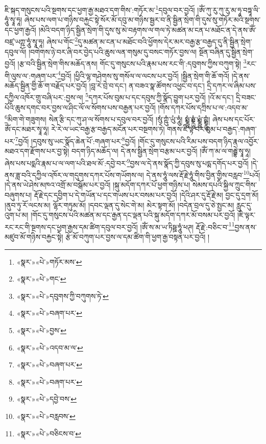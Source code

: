 ཇི་སྐད་གསུངས་པའི་སྔགས་དང་ཕྱག་རྒྱ་མཐའ་དག་གིས་:གཏོར་མ་\footnote{«སྣར་»«པེ་»གཏོར་མས་}དབུལ་བར་བྱའོ། །ཨོཾ་ཀུ་རུ་ཀུ་རུ་མ་ཧཱ་བཏྟཱ་ལི་ཧཱུཾ་སྭཱ་ཧཱ། ཞེས་པས་ལག་པ་གཉིས་བརྐྱང་སྟེ་སོར་མོ་དབུ་མ་གཉིས་སྦྱར་བ་ནི་སྦྱིན་སྲེག་གི་དུས་སུ་གཏོར་མའི་སྔགས་དང་ཕྱག་རྒྱའོ། །མེའི་བདག་ཉིད་སྦྱིན་སྲེག་གི་དུས་སུ་མེ་བརྟགས་ལ་གལ་ཏེ་མཚན་མ་ངན་པ་མཐོང་ན་དེ་ནས་ཨོཾ་བཛྲ་ཡཀྵ་ཧཱུཾ་སྭཱ་ཧཱ། ཞེས་པ་གོང་\footnote{«སྣར་»«པེ་»གང་}དུ་མཚན་མ་ངན་པ་མཐོང་བའི་ཕྱོགས་དེར་མར་བརྒྱ་རྩ་བརྒྱད་དུ་ནི་སྦྱིན་སྲེག་དབུལ་ལོ། །བགེགས་ཉེ་བར་ཞི་བར་བྱེད་པའི་ཆུས་ལན་གསུམ་དུ་བསང་གཏོར་བྱས་ལ། སྔོན་བཞིན་དུ་སྦྱིན་སྲེག་བྱའོ། །རྩ་བའི་སྦྱིན་སྲེག་གིས་མཆོད་ནས། གོང་དུ་གསུངས་པའི་རྣམ་པས་རང་གི་:དབུགས་ཀྱིས་བཀུག་སྟེ། \footnote{«སྣར་»«པེ་»དབུགས་ཀྱི་བཀུགས་ཏེ་}རང་གི་ལུས་ལ་:གཞག་པར་\footnote{«སྣར་»«པེ་»བཞག་པར་}བྱའོ། །ཕྱིའི་ལྷ་གཤེགས་སུ་གསོལ་ལ་ལངས་པར་བྱའོ། །སྦྱིན་སྲེག་གི་ཆོ་གའོ། །དེ་ནས་མཆོད་སྦྱིན་གྱི་ཆོ་ག་བརྗོད་པར་བྱའོ། །བླ་རེ་བྲེ་བ་དང་། ན་བཟའ་སྣ་ཚོགས་འཕྱང་བ་དང་། དྲི་དཀར་ལ་ཞིམ་པས་དཀྱིལ་འཁོར་གྲུ་བཞི་པར་:བྱས་ལ། \footnote{«སྣར་»«པེ་»བྱས་}དཀར་པོས་བུམ་པ་དང་དབུས་ཀྱི་སྣོད་བྱུག་པར་བྱའོ། །འོ་མ་དང་། དྲི་བཟང་པོའི་ཆུས་དགང་བར་བྱས་ལ་ཤིང་ལོ་ལ་སོགས་པས་བརྒྱན་པར་བྱའོ། །གོས་དཀར་པོས་དཀྲིས་པ་ལ་:འདབ་མ་\footnote{«སྣར་»«པེ་»འདབ་མ་ལ་}མིག་གེ་གཟུགས། སེན་རྩི་དང་ཀུ་ཤ་ལ་སོགས་པ་དབུལ་བར་བྱའོ། །སུཾ་ཀྵུཾ་ཡུཾ་ཧཱུཾ། སྨྼྻུཾ་ཧྨྼྻུཾ་ཡྨྼྻུཾ་ཀྵྨྼྻུཾ། ཞེས་པས་དང་པོར་ཨོཾ་དང་མཐར་སྭཱ་ཧཱ། རེ་རེ་ལ་ཡང་བརྒྱ་རྩ་བརྒྱད་མངོན་པར་བསྔགས་ཏེ། གནས་ཇི་ལྟ་བར་བུམ་པ་བརྒྱད་:གཞག་པར་\footnote{«སྣར་»«པེ་»བཞག་པར་}བྱའོ། །དབུས་སུ་ཡང་སྣོད་ཆེན་པོ་:གཞག་པར་\footnote{«སྣར་»«པེ་»བཞག་པར་}བྱའོ། །གོང་དུ་གསུངས་པའི་རིམ་པས་བདག་ཉིད་རྣལ་འབྱོར་མཐའ་དག་རྫོགས་པར་བྱ་སྟེ། བདག་ཉིད་མཆོད་ལ། དེ་ནས་སྦྱིན་སྲེག་བརྩམ་པར་བྱའོ། །ཨོཾ་ཀ་མ་ལ་གརྦྷེ་སྭཱ་ཧཱ། ཞེས་པས་པདྨའི་རྣམ་པ་ལ་ལག་པའི་ཐལ་མོ་:དབྱེ་བར་\footnote{«སྣར་»«པེ་»དབྱེ་བས་}བྱས་ལ་དེ་ནས་སྣོད་ཀྱི་དབུས་སུ་པདྨ་དགོད་པར་བྱའོ། །དེ་ནས་ཟླ་བའི་དཀྱིལ་འཁོར་ལ་གདུགས་དཀར་པོས་གཡོགས་ལ། དེ་ནས་ཧཱུཾ་ལས་རྡོ་རྗེ་ཧཱུཾ་གིས་བྱིན་གྱིས་བརླབ་\footnote{«སྣར་»«པེ་»བརླབས་}པའོ། །དེ་ནས་ཡེ་ཤེས་མཁའ་འགྲོ་མ་བསྒོམ་པར་བྱའོ། །སྐུ་མདོག་དཀར་པོ་ཕྱག་གཉིས་པ། སེམས་དཔའི་སྐྱིལ་ཀྲུང་གིས་བཞུགས་པ། རྡོ་རྗེ་དང་དབྱིག་པ་དེ་གཡོན་པ་དང་གཡས་པར་བསམ་པར་བྱའོ། །དེའི་ཤར་དུ་རྡོ་རྗེ་མ། བྱང་དུ་དྲག་མོ། །ནུབ་ཏུ་རོ་ལངས་མ། ལྷོར་གཏུམ་མོ། །དབང་ལྡན་དུ་སེང་གེ་མ། མེར་སྟག་མོ། །བདེན་བྲལ་དུ་ཅེ་སྤྱང་མ། རླུང་དུ་འུག་པ་མ། །གོང་དུ་གསུངས་པའི་མཚན་མ་དང་རྒྱན་དང་ལྡན་པའི་སྐུ་མདོག་དཀར་མོ་བསམ་པར་བྱའོ། །ཇི་ལྟར་རང་རང་གི་སྔགས་དང་ཕྱག་རྒྱས་དམ་ཚིག་དབུལ་བར་བྱའོ། །ཨོཾ་ས་མ་ཡ་ཏིཥྛ་ཧཱུཾ་ཕཊ། རྡོ་རྗེ་:བཅིང་བ་\footnote{«སྣར་»«པེ་»བཅིངས་བ་}བྱས་ནས་མཛུབ་མོ་གཉིས་བརྐྱང་སྟེ། རྩེ་མོ་བཀུག་པར་བྱས་ལ་དམ་ཚིག་གི་ཕྱག་རྒྱ་བསྟན་པར་བྱའོ། །
